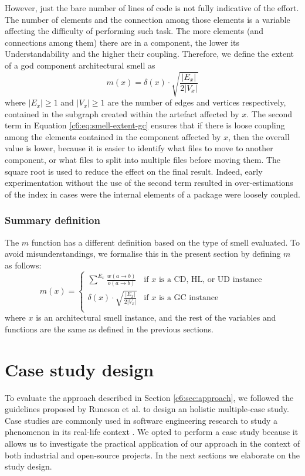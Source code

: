 However, just the bare number of lines of code is not fully indicative of the effort.
The number of elements and the connection among those elements is a variable affecting the difficulty of performing such task. The more elements (and connections among them) there are in a component, the lower its Understandability \cite[p. 32]{Lippert2006} and the higher their coupling.
Therefore, we define the extent of a god component architectural smell as
\begin{equation}\label{c6:eq:smell-extent-gc}
    m(x) = \delta(x) \cdot \sqrt{\frac{|E_x|}{2|V_x|}}
\end{equation}
where $|E_x| \ge 1$ and $|V_x| \ge 1$ are the number of edges and vertices respectively, contained in the subgraph created within the artefact affected by $x$.
The second term in Equation \ref{c6:eq:smell-extent-gc} ensures that if there is loose coupling among the elements contained in the component affected by $x$, then the overall value is lower, because it is easier to identify what files to move to another component, or what files to split into multiple files before moving them. The square root is used to reduce the effect on the final result.
Indeed, early experimentation without the use of the second term resulted in over-estimations of the index in cases were the internal elements of a package were loosely coupled.

\subsubsection{Summary definition}
The $m$ function has a different definition based on the type of smell evaluated. To avoid misunderstandings, we formalise this in the present section by defining $m$ as follows:
\begin{equation}\label{c6:eq:smell-extent-all}
    m(x) = \begin{cases}
        \sum^{E_x} \frac{w(a\rightarrow b)}{o(a \rightarrow b)} & \text{if $x$ is a CD, HL, or UD instance}\\
        \delta(x) \cdot \sqrt{\frac{|E_x|}{2|V_x|}} & \text{if $x$ is a GC instance}\\
    \end{cases} 
\end{equation}
where $x$ is an architectural smell instance, and the rest of the variables and functions are the same as defined in the previous sections.


\section{Case study design}\label{c6:sec:study-design}
To evaluate the approach described in Section \ref{c6:sec:approach}, we followed the guidelines proposed by Runeson et al. \cite{Runeson2012} to design an holistic multiple-case study.
Case studies are commonly used in software engineering research to study a phenomenon in its real-life context \cite{Runeson2012}.
We opted to perform a case study because it allows us to investigate the practical application of our approach in the context of both industrial and open-source projects. 
In the next sections we elaborate on the study design.

